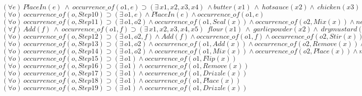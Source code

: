 \documentclass[10pt,a4paper]{article}
\begin{document}
	$(\forall e)\,PlaceIn(e) \  \wedge \  occurrence\_of(o1,e) \supset (\exists\,x1,x2,x3,x4)\  \wedge butter(x1) \ \wedge \  hotsauce(x2) \wedge \ chicken(x3) \wedge bag(x4)$\\
	
	$(\forall o) \ occurrence\_of(o,Step10) \supset (\exists\, o1,e)  \wedge PlaceIn(e) \wedge occurrence\_of(o1, e)$\\
	
$	(\forall o) \ occurrence\_of(o,Step11) \supset (\exists\, o1,o2) \wedge occurrence\_of(o1, Seal(x)) \wedge occurrence\_of(o2,Mix(x)) \wedge  next\_subacc(o1,o2)$\\
	
	$(\forall f)\,Add(f) \  \wedge \  occurrence\_of(o1,f) \supset (\exists\,x1,x2,x3,x4,x5)\  \ flour(x1) \ \wedge \  garlicpowder(x2) \wedge \ drymustard(x3) \   \wedge \ paprika(x4)  \  \wedge \  spices(x5)$\\
	
	$(\forall o) \ occurrence\_of(o,Step12) \supset (\exists\, o1,o2,f) \wedge Add(f) \wedge occurrence\_of(o1,f) \wedge occurrence\_of(o2,Stir(x)) \wedge  next\_subacc(o1,o2)$\\
	
	$(\forall o) \ occurrence\_of(o,Step13) \supset (\exists\, o1,o2) \wedge occurrence\_of(o1,Add(x)) \wedge occurrence\_of(o2,Remove(x)) \wedge  next\_subacc(o1,o2)$\\
	
	$(\forall o) \ occurrence\_of(o,Step14) \supset (\exists\, o1,o2) \wedge occurrence\_of(o1,Mix(x)) \wedge occurrence\_of(o2,Place(x)) \wedge  next\_subacc(o1,o2)$\\
	
	$(\forall o) \ occurrence\_of(o,Step15) \supset (\exists\, o1) \wedge occurrence\_of(o1,Flip(x))$\\
	
	$(\forall o) \ occurrence\_of(o,Step16) \supset (\exists\, o1) \wedge occurrence\_of(o1,Remove(x))$\\
	
	$(\forall o) \ occurrence\_of(o,Step17) \supset (\exists\, o1) \wedge occurrence\_of(o1,Drizzle(x))$\\
	
	$(\forall o) \ occurrence\_of(o,Step18) \supset (\exists\, o1) \wedge occurrence\_of(o1,Place(x))$\\
	
$	(\forall o) \ occurrence\_of(o,Step19) \supset (\exists\, o1) \wedge occurrence\_of(o1,Drizzle(x))$\\
	
	
\end{document}
